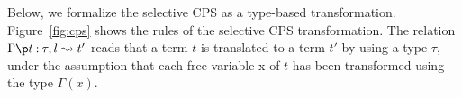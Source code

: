 
Below, we formalize the selective CPS as a type-based transformation.
Figure~\ref{fig:cps} shows the rules of the selective CPS
transformation.  The relation $\CPS{\Gamma}{t}{\tau}{l}{t'}$ reads that
a term $t$ is translated to a term $t'$ by using a type $\tau$, under
the assumption that each free variable x of $t$ has been transformed
using the type $\Gamma(x)$.

